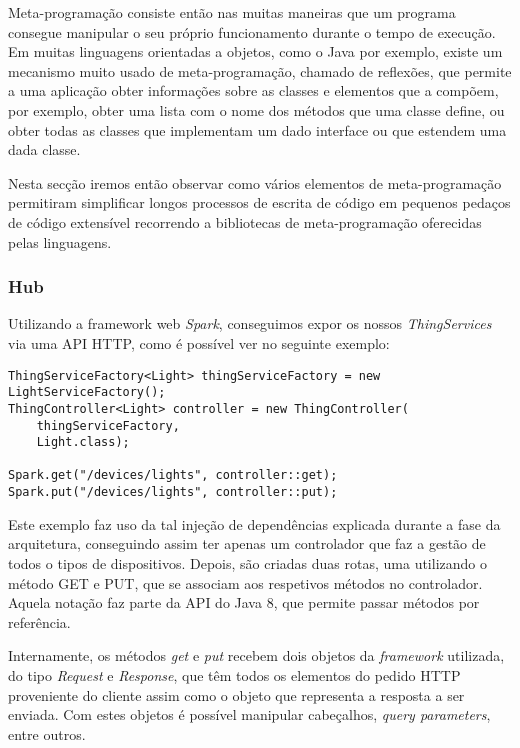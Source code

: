Meta-programação consiste então nas muitas maneiras que um programa consegue manipular o seu próprio funcionamento durante o tempo de execução. Em muitas linguagens orientadas a objetos, como o Java por exemplo, existe um mecanismo muito usado de meta-programação, chamado de reflexões, que permite a uma aplicação obter informações sobre as classes e elementos que a compõem, por exemplo, obter uma lista com o nome dos métodos que uma classe define, ou obter todas as classes que implementam um dado interface ou que estendem uma dada classe.

Nesta secção iremos então observar como vários elementos de meta-programação permitiram simplificar longos processos de escrita de código em pequenos pedaços de código extensível recorrendo a bibliotecas de meta-programação oferecidas pelas linguagens.

\subsubsection{Hub}

Utilizando a framework web \textit{Spark}, conseguimos expor os nossos \textit{ThingServices} via uma API HTTP, como é possível ver no seguinte exemplo:

\begin{verbatim}
ThingServiceFactory<Light> thingServiceFactory = new LightServiceFactory();
ThingController<Light> controller = new ThingController(
    thingServiceFactory,
    Light.class);

Spark.get("/devices/lights", controller::get);
Spark.put("/devices/lights", controller::put);
\end{verbatim}

Este exemplo faz uso da tal injeção de dependências explicada durante a fase da arquitetura, conseguindo assim ter apenas um controlador que faz a gestão de todos o tipos de dispositivos. Depois, são criadas duas rotas, uma utilizando o método GET e PUT, que se associam aos respetivos métodos no controlador. Aquela notação faz parte da API do Java 8, que permite passar métodos por referência.

Internamente, os métodos \textit{get} e \textit{put} recebem dois objetos da \textit{framework} utilizada, do tipo \textit{Request} e \textit{Response}, que têm todos os elementos do pedido HTTP proveniente do cliente assim como o objeto que representa a resposta a ser enviada. Com estes objetos é possível manipular cabeçalhos, \textit{query parameters}, entre outros.

